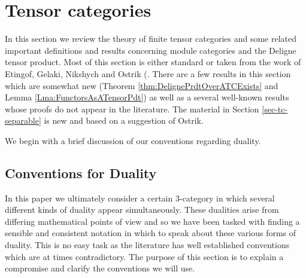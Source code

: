 \documentclass{amsart}
\begin{document}
\section{Tensor categories} \label{sec-tc}


In this section we review the theory of finite tensor categories and some related important definitions and results concerning module categories and the Deligne tensor product.  Most of this section is either standard or taken from the work of Etingof, Gelaki, Nikshych and Ostrik (\cite{MR1976459,MR2183279,MR2097289, 0909.3140, EGNO}.  There are a few results in this section which are somewhat new (Theorem \ref{thm:DelignePrdtOverATCExists} and Lemma \ref{Lma:FunctorsAsATensorPdt}) as well as a several well-known results whose proofs do not appear in the literature. The material in Section \ref{sec-tc-separable} is new and based on a suggestion of Ostrik.

We begin with a brief discussion of our conventions regarding duality.




\subsection{Conventions for Duality}
In this paper we ultimately consider a certain 3-category in which several different kinds of duality appear simultaneously. These dualities arise from differing mathematical points of view and so we have been tasked with finding a sensible and consistent notation in which to speak about these various forms of duality. This is no easy task as the literature has well established conventions which are at times contradictory.  The purpose of this section is to explain a compromise and clarify the conventions we will use.
\end{document}
